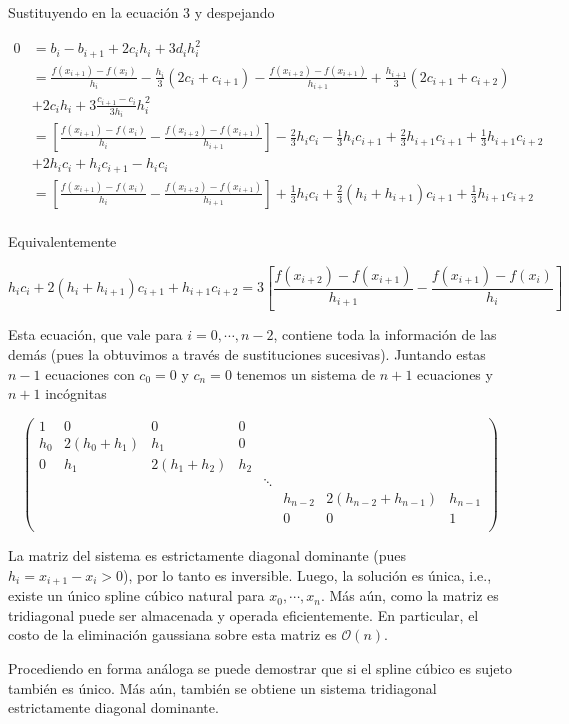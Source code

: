 Sustituyendo en la ecuación 3 y despejando

\begin{align*}
0 & = b_i - b_{i + 1} + 2c_ih_{i} + 3d_i h_{i}^2\\
	& = \frac{f(x_{i + 1}) - f(x_i)}{h_{i}} - \frac{h_{i}}{3}\left(2c_i + c_{i + 1}\right) -
		\frac{f(x_{i + 2}) - f(x_{i + 1})}{h_{i + 1}} + \frac{h_{i + 1}}{3}\left(2c_{i + 1} + c_{i + 2}\right)\\
		& +2c_ih_{i} + 3\frac{c_{i + 1} - c_i}{3 h_{i}} h_{i}^2\\
	& = \left[\frac{f(x_{i + 1}) - f(x_i)}{h_{i}} - \frac{f(x_{i + 2}) - f(x_{i + 1})}{h_{i + 1}}\right]
		 - \frac{2}{3} h_{i} c_i - \frac{1}{3} h_{i} c_{i + 1} + \frac{2}{3} h_{i + 1} c_{i + 1} + \frac{1}{3} h_{i + 1} c_{i + 2}\\
		& + 2h_{i} c_i + h_{i} c_{i + 1} - h_{i}c_i\\
	& = \left[\frac{f(x_{i + 1}) - f(x_i)}{h_{i}} - \frac{f(x_{i + 2}) - f(x_{i + 1})}{h_{i + 1}}\right]
		 + \frac{1}{3}h_i c_i + \frac{2}{3} (h_i + h_{i + 1}) c_{i + 1} + \frac{1}{3}h_{i + 1} c_{i + 2}\\
\end{align*}

Equivalentemente

\[h_i c_i + 2 (h_i + h_{i + 1}) c_{i + 1} + h_{i + 1} c_{i + 2} = 
3 \left[\frac{f(x_{i + 2}) - f(x_{i + 1})}{h_{i + 1}} - \frac{f(x_{i + 1}) - f(x_i)}{h_{i}}\right]
\]

Esta ecuación, que vale para $i = 0, \cdots, n - 2$, contiene toda la información de las demás (pues la obtuvimos a través de sustituciones sucesivas). Juntando estas $n - 1$ ecuaciones con $c_0 = 0$ y $c_n = 0$ tenemos un sistema de $n + 1$ ecuaciones y $n + 1$ incógnitas

\[
\begin{pmatrix}
1 		& 0 				& 0 				& 0 			& 			&  			& 							&			\\
h_0 		& 2(h_0 + h_1) 	& h_1 			& 0 			&		 	& 			&							& 			\\
0 		& h_1			& 2(h_1 + h_2)	& h_2 		& 		 	&  			&							& 			\\
		&				&				& 			& \ddots		& 			&							& 			\\
		&				&				& 			& 			& h_{n - 2} & 2(h_{n - 2} + h_{n - 1}) 	& h_{n - 1}\\
		&				&				&			&			&	0		&			0				& 1			\\
\end{pmatrix}\]

La matriz del sistema es estrictamente diagonal dominante (pues $h_i = x_{i + 1} - x_i > 0$), por lo tanto es inversible. Luego, la solución es única, i.e., existe un único spline cúbico natural para $x_0, \cdots, x_n$. Más aún, como la matriz es tridiagonal puede ser almacenada y operada eficientemente. En particular, el costo de la eliminación gaussiana sobre esta matriz es $\mathcal{O}(n)$.

Procediendo en forma análoga se puede demostrar que si el spline cúbico es sujeto también es único. Más aún, también se obtiene un sistema tridiagonal estrictamente diagonal dominante.